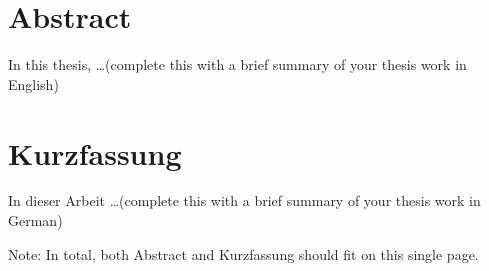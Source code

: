\section*{Abstract}

In this thesis, \ldots (complete this with a brief summary of your thesis work in English)

\section*{Kurzfassung}

In dieser Arbeit \ldots (complete this with a brief summary of your thesis work in German)

Note: In total, both Abstract and Kurzfassung should fit on this single page.
